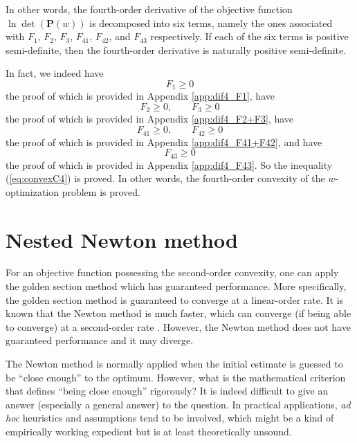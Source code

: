 \documentclass[12pt]{article}
\begin{document}
In other words, the fourth-order derivative of the objective function $\ln \det(\mathbf{P}(w))$ is decomposed into six terms, namely the ones associated with $F_1$, $F_2$, $F_3$, $F_{41}$, $F_{42}$, and $F_{43}$ respectively. If each of the six terms is positive semi-definite, then the fourth-order derivative is naturally positive semi-definite.

In fact, we indeed have 
\begin{equation}  \label{eq:dif4_F1}
F_1 \geq 0
\end{equation}
the proof of which is provided in Appendix \ref{app:dif4_F1}, have
\begin{equation}  \label{eq:dif4_F2+F3}
F_2 \geq 0, \qquad F_3 \geq 0
\end{equation}
the proof of which is provided in Appendix \ref{app:dif4_F2+F3}, have
\begin{equation}  \label{eq:dif4_F41+F42}
F_{41} \geq 0, \qquad F_{42} \geq 0
\end{equation}
the proof of which is provided in Appendix \ref{app:dif4_F41+F42}, and have
\begin{equation}  \label{eq:dif4_F43}
F_{43} \geq 0
\end{equation}
the proof of which is provided in Appendix \ref{app:dif4_F43}. So the inequality (\ref{eq:convexC4}) is proved. In other words, the fourth-order convexity of the $w$-optimization problem is proved.

\section{Nested Newton method}  \label{sec:nested_newton}

For an objective function possessing the second-order convexity, one can apply the golden section method which has guaranteed performance. More specifically, the golden section method is guaranteed to converge at a linear-order rate. It is known that the Newton method is much faster, which can converge (if being able to converge) at a second-order rate \cite{Bonnans2006}. However, the Newton method does not have guaranteed performance and it may diverge.

The Newton method is normally applied when the initial estimate is guessed to be ``close enough'' to the optimum. However, what is the mathematical criterion that defines ``being close enough'' rigorously? It is indeed difficult to give an answer (especially a general answer) to the question. In practical applications, \textit{ad hoc} heuristics and assumptions tend to be involved, which might be a kind of empirically working expedient but is at least theoretically unsound.
\end{document}
